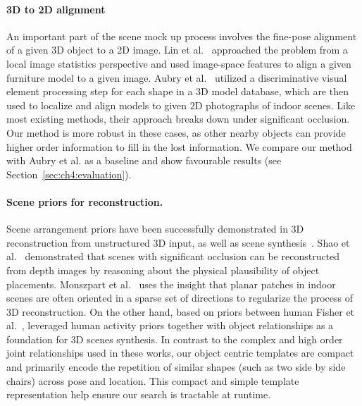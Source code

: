 \documentclass[10pt,twocolumn,letterpaper]{article}
\begin{document}
\paragraph{3D to 2D alignment} An important part of the scene mock up process
involves the fine-pose alignment of a given 3D object to a 2D image. 
Lin et al.~\cite{Lim:2013:ICCV} approached the problem from a local image
statistics perspective and used image-space features to align a given furniture
model to a given image. Aubry et al.~\cite{Aubry:2014:CVPR} utilized a
discriminative visual element processing step for each shape in a 3D model
database, which are then used to localize and align models to given 2D
photographs of indoor scenes. Like most existing methods, their approach breaks
down under significant occlusion. Our method is more robust in these cases, as
other nearby objects can provide higher order information to fill in the lost
information. We compare our method with Aubry et al. as a baseline and show
favourable results (see Section~\ref{sec:ch4:evaluation}).

\paragraph{Scene priors for reconstruction.} Scene arrangement priors have been
successfully demonstrated in 3D reconstruction from unstructured 3D input, as
well as scene synthesis~\cite{Fisher:2012:SIGGASIA}. Shao et al.~\cite{Shao:2014:SIGGRAPH}
demonstrated that scenes with significant occlusion can be reconstructed from depth
images by reasoning about the physical plausibility of object placements.
Monszpart et al.~\cite{Monszpart:2015:SIGGRAPH} uses the insight that
planar patches in indoor scenes are often oriented in a sparse set of
directions to regularize the process of 3D reconstruction. On the other hand,
based on priors between human  Fisher et al.~\cite{Fisher:2015:SIGGRAPH},
leveraged human activity priors together with object relationships as a
foundation for 3D scenes synthesis. In contrast to the complex and high order
joint relationships used in these works, our object centric templates are
compact and primarily encode the repetition of similar shapes (such as two side
by side chairs) across pose and location.  This compact and simple template
representation help ensure our search is tractable at runtime. 
\end{document}
